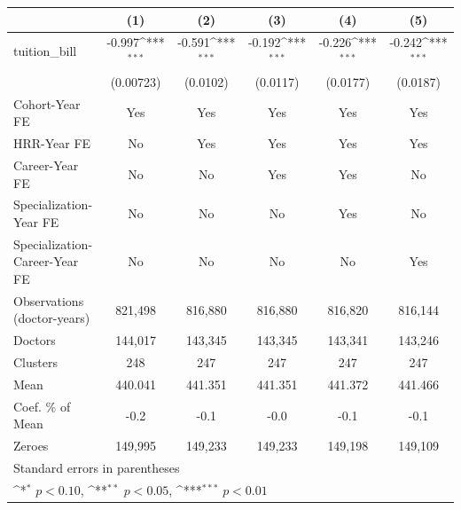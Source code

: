 {
\def\sym#1{\ifmmode^{#1}\else\(^{#1}\)\fi}
\begin{tabular}{l*{5}{c}}
\hline\hline
                    &\multicolumn{1}{c}{(1)}         &\multicolumn{1}{c}{(2)}         &\multicolumn{1}{c}{(3)}         &\multicolumn{1}{c}{(4)}         &\multicolumn{1}{c}{(5)}         \\
\hline
tuition\_bill        &      -0.997\sym{***}&      -0.591\sym{***}&      -0.192\sym{***}&      -0.226\sym{***}&      -0.242\sym{***}\\
                    &   (0.00723)         &    (0.0102)         &    (0.0117)         &    (0.0177)         &    (0.0187)         \\
[1em]
Cohort-Year FE      &         Yes         &         Yes         &         Yes         &         Yes         &         Yes         \\
[1em]
HRR-Year FE         &          No         &         Yes         &         Yes         &         Yes         &         Yes         \\
[1em]
Career-Year FE      &          No         &          No         &         Yes         &         Yes         &          No         \\
[1em]
Specialization-Year FE&          No         &          No         &          No         &         Yes         &          No         \\
[1em]
Specialization-Career-Year FE&          No         &          No         &          No         &          No         &         Yes         \\
\hline
Observations (doctor-years)&     821,498         &     816,880         &     816,880         &     816,820         &     816,144         \\
Doctors             &     144,017         &     143,345         &     143,345         &     143,341         &     143,246         \\
Clusters            &         248         &         247         &         247         &         247         &         247         \\
Mean                &     440.041         &     441.351         &     441.351         &     441.372         &     441.466         \\
Coef. \% of Mean    &        -0.2         &        -0.1         &        -0.0         &        -0.1         &        -0.1         \\
Zeroes              &     149,995         &     149,233         &     149,233         &     149,198         &     149,109         \\
\hline\hline
\multicolumn{6}{l}{\footnotesize Standard errors in parentheses}\\
\multicolumn{6}{l}{\footnotesize \sym{*} \(p<0.10\), \sym{**} \(p<0.05\), \sym{***} \(p<0.01\)}\\
\end{tabular}
}
